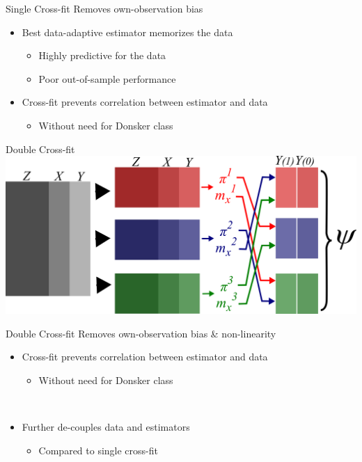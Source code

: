 \documentclass{beamer}
\begin{document}
\begin{frame}{Single Cross-fit}
	Removes own-observation bias
	\begin{itemize}
		\item Best data-adaptive estimator memorizes the data
		\begin{itemize}
			\item Highly predictive for the data
			\item Poor out-of-sample performance
		\end{itemize}
		\item Cross-fit prevents correlation between estimator and data
		\begin{itemize}
			\item Without need for Donsker class
		\end{itemize}
	\end{itemize}
\end{frame}

\begin{frame}{Double Cross-fit}
	\centering
	\includegraphics[scale=0.54]{images/double_xfit.png}
\end{frame}

\begin{frame}{Double Cross-fit}
	Removes own-observation bias \& non-linearity
	\begin{itemize}
		\item Cross-fit prevents correlation between estimator and data
		\begin{itemize}
			\item Without need for Donsker class
		\end{itemize}~\\
		\item Further de-couples data and estimators
		\begin{itemize}
			\item Compared to single cross-fit
		\end{itemize}
	\end{itemize}
\end{frame}
\end{document}
